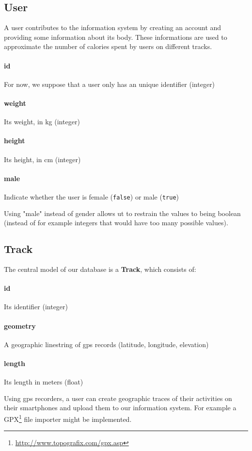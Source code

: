 \documentclass[a4paper]{article}
\begin{document}
\subsection{User}
A user contributes to the information system by creating an account and providing
some information about its body. These informations are used to approximate the
number of calories spent by users on different tracks.

\paragraph{id} For now, we suppose that a user only has an unique identifier (integer)
\paragraph{weight} Its weight, in kg (integer)
\paragraph{height} Its height, in cm (integer)
\paragraph{male} Indicate whether the user is female (\texttt{false}) or male (\texttt{true})

Using "male" instead of gender allows ut to restrain the values to being boolean (instead of for example integers that would have too many possible values).


\subsection{Track}
The central model of our database is a \textbf{Track}, which consists of:

\paragraph{id} Its identifier (integer)
\paragraph{geometry} A geographic linestring of gps records (latitude, longitude, elevation)
\paragraph{length} Its length in meters (float)

Using gps recorders, a user can create geographic traces of their activities on
their smartphones and upload them to our information system. For example a GPX\footnote{\url{http://www.topografix.com/gpx.asp}}
file importer might be implemented.
\end{document}
